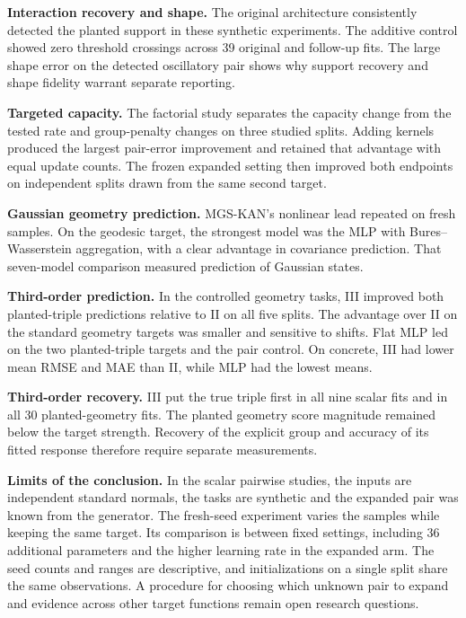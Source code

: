 \documentclass[11pt]{article}
\numberwithin{equation}{section}
\begin{document}
\textbf{Interaction recovery and shape.} The original architecture consistently detected the
planted support in these synthetic experiments. The additive control showed zero threshold
crossings across 39 original and follow-up fits. The large shape error on the detected
oscillatory pair shows why support recovery and shape fidelity warrant separate reporting.

\textbf{Targeted capacity.} The factorial study separates the capacity change from the tested
rate and group-penalty changes on three studied splits. Adding kernels produced the largest
pair-error improvement and retained that advantage with equal update counts. The frozen
expanded setting then improved both endpoints on independent splits drawn from the same second
target.

\textbf{Gaussian geometry prediction.} MGS-KAN's nonlinear lead repeated on fresh samples. On
the geodesic target, the strongest model was the MLP with Bures--Wasserstein aggregation, with
a clear advantage in covariance prediction. That seven-model comparison measured
prediction of Gaussian states.

\textbf{Third-order prediction.} In the controlled geometry tasks, III improved
both planted-triple predictions relative to II on all five splits. The advantage
over II on the standard geometry targets was smaller and sensitive to shifts.
Flat MLP led on the two planted-triple targets and the pair control. On concrete,
III had lower mean RMSE and MAE than II, while MLP had the lowest means.

\textbf{Third-order recovery.} III put the true triple first in all nine scalar
fits and in all 30 planted-geometry fits. The planted geometry score magnitude
remained below the target strength. Recovery of the explicit group and accuracy
of its fitted response therefore require separate measurements.

\textbf{Limits of the conclusion.} In the scalar pairwise studies, the inputs are independent
standard normals, the tasks are synthetic and the expanded pair was known from the generator.
The fresh-seed experiment varies
the samples while keeping the same target. Its comparison is between fixed settings, including
36 additional parameters and the higher learning rate in the expanded arm. The seed counts and
ranges are descriptive, and initializations on a single split share the same observations. A
procedure for choosing which unknown pair to expand and evidence across other target functions
remain open research questions.
\end{document}
